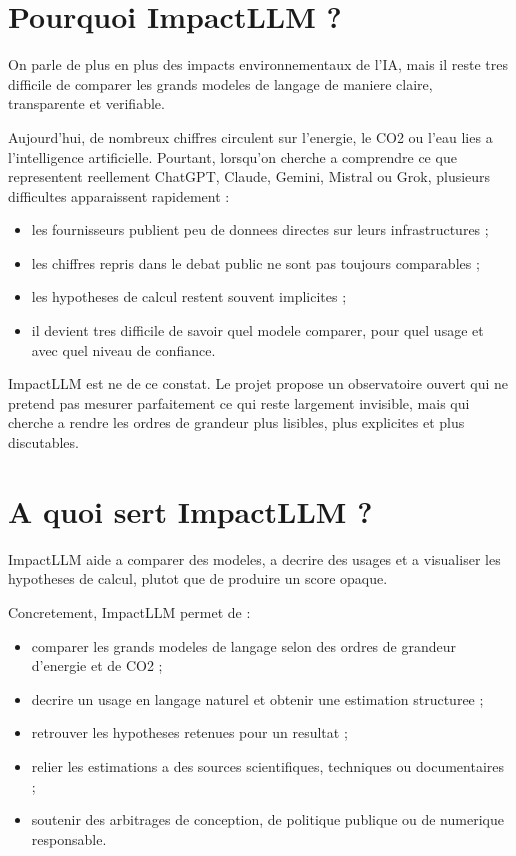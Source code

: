 \documentclass[11pt,a4paper]{article}
\newcommand{\sectionlead}[1]{%
  \noindent\colorbox{emotiaLightBlue}{%
    \parbox{\dimexpr\textwidth-2\fboxsep}{\small #1}%
  }\par
  \vspace{0.45em}
}
\begin{document}
\setcounter{page}{2}
\thispagestyle{empty}
\tableofcontents
\newpage

\section{Pourquoi ImpactLLM ?}
\sectionlead{On parle de plus en plus des impacts environnementaux de l'IA, mais il reste tres difficile de comparer les grands modeles de langage de maniere claire, transparente et verifiable.}

Aujourd'hui, de nombreux chiffres circulent sur l'energie, le CO2 ou l'eau lies a l'intelligence artificielle. Pourtant, lorsqu'on cherche a comprendre ce que representent reellement ChatGPT, Claude, Gemini, Mistral ou Grok, plusieurs difficultes apparaissent rapidement :
\begin{itemize}
  \item les fournisseurs publient peu de donnees directes sur leurs infrastructures ;
  \item les chiffres repris dans le debat public ne sont pas toujours comparables ;
  \item les hypotheses de calcul restent souvent implicites ;
  \item il devient tres difficile de savoir quel modele comparer, pour quel usage et avec quel niveau de confiance.
\end{itemize}

ImpactLLM est ne de ce constat. Le projet propose un observatoire ouvert qui ne pretend pas mesurer parfaitement ce qui reste largement invisible, mais qui cherche a rendre les ordres de grandeur plus lisibles, plus explicites et plus discutables.

\section{A quoi sert ImpactLLM ?}
\sectionlead{ImpactLLM aide a comparer des modeles, a decrire des usages et a visualiser les hypotheses de calcul, plutot que de produire un score opaque.}

Concretement, ImpactLLM permet de :
\begin{itemize}
  \item comparer les grands modeles de langage selon des ordres de grandeur d'energie et de CO2 ;
  \item decrire un usage en langage naturel et obtenir une estimation structuree ;
  \item retrouver les hypotheses retenues pour un resultat ;
  \item relier les estimations a des sources scientifiques, techniques ou documentaires ;
  \item soutenir des arbitrages de conception, de politique publique ou de numerique responsable.
\end{itemize}
\end{document}
